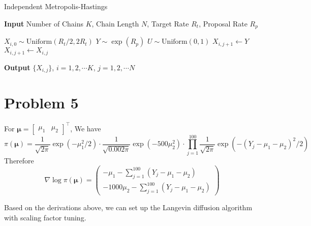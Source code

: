 \documentclass[12pt]{article}
\begin{document}
\begin{algorithm}
	\caption{Independent Metropolis-Hastings}\label{IMH}
	\hspace*{\algorithmicindent} \textbf{Input} Number of Chains $K$, Chain Length $N$, Target Rate $R_{t}$, Proposal Rate $R_{p}$
	\begin{algorithmic}[1]
			\State $X_{i,0} \sim \text{Uniform}(R_t/2, 2R_t)$
			\State $Y \sim \exp (R_p)$
			\State $U \sim \text{Uniform}(0, 1)$
			\State $X_{i,j+1}\gets Y$
			\Else
			\State $X_{i,j+1}\gets X_{i,j}$
			\EndIf
			\EndFor
		\EndFor
	\end{algorithmic}
	\hspace*{\algorithmicindent} \textbf{Output} $\{ X_{i,j}\}$, $i=1,2,\cdots K$, $j=1,2,\cdots N$
\end{algorithm}


\section*{Problem 5}
 For $\bm{\mu} = \begin{bmatrix}\mu_1 & \mu_2\end{bmatrix}^\top$, We have 
 \[ \pi (\bm{\mu}) = \frac{1}{\sqrt{2\pi}} \exp\left( -\mu_1^2/2\right)\cdot \frac{1}{\sqrt{0.002\pi}}\exp\left( -500\mu_2^2\right)\cdot \prod_{j=1}^{100}\frac{1}{\sqrt{2\pi}} \exp \left(-(Y_j - \mu_1 - \mu_2)^2 / 2 \right)  \] 
Therefore
\[ \nabla \log \pi(\bm{\mu}) = \begin{pmatrix}
	-\mu_1 - \sum_{j=1}^{100}(Y_j - \mu_1 - \mu_2) \\
	-1000 \mu_2 - \sum_{j=1}^{100}(Y_j - \mu_1 - \mu_2)
 \end{pmatrix} \]

Based on the derivations above, we can set up the Langevin diffusion algorithm with scaling factor tuning.
\end{document}
